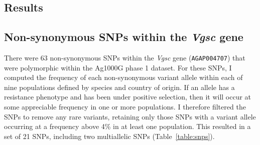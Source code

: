 \begin{refsection}
\section{Results}\label{sec:ch6-results}


\subsection{Non-synonymous SNPs within the \textit{Vgsc} gene}\label{subsec:results-snps}


There were 63 non-synonymous SNPs within the \textit{Vgsc} gene (\texttt{AGAP004707}) that were polymorphic within the Ag1000G phase 1 dataset.
%
For these SNPs, I computed the frequency of each non-synonymous variant allele within each of nine populations defined by species and country of origin.
%
If an allele has a resistance phenotype and has been under positive selection, then it will occur at some appreciable frequency in one or more populations.
%
I therefore filtered the SNPs to remove any rare variants, retaining only those SNPs with a variant allele occurring at a frequency above 4\% in at least one population.
%
This resulted in a set of 21 SNPs, including two multiallelic SNPs (Table~\ref{table:snps}).


%
\end{refsection}
